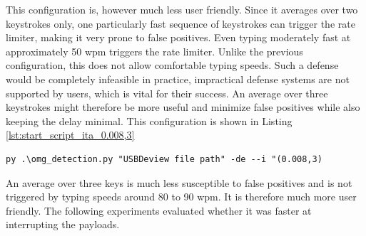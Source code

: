 This configuration is, however much less user friendly. Since it averages over two keystrokes only, one particularly fast sequence of keystrokes can trigger the rate limiter, making it very prone to false positives. Even typing moderately fast at approximately 50 wpm triggers the rate limiter. Unlike the previous configuration, this does not allow comfortable typing speeds. Such a defense would be completely infeasible in practice, impractical defense systems are not supported by users, which is vital for their success. An average over three keystrokes might therefore be more useful and minimize false positives while also keeping the delay minimal. This configuration is shown in Listing  \ref{lst:start_script_ita_0.008,3}   
\begin{lstlisting}[caption={start Defense Script with ITA (0.02,2)},label={lst:start_script_ita_0.008,3}, captionpos=b]
 py .\omg_detection.py "USBDeview file path" -de --i "(0.008,3)
\end{lstlisting}

An average over three keys is much less susceptible to false positives and is not triggered by typing speeds around 80 to 90 wpm. It is therefore much more user friendly. The following experiments evaluated whether it was faster at interrupting the payloads. 





















